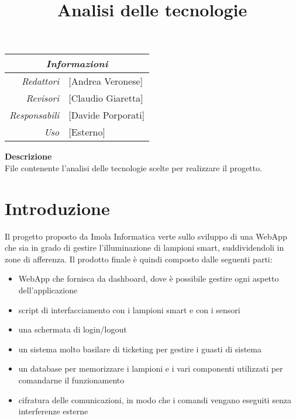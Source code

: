 \documentclass[12pt]{article}
\begin{document}
\graphicspath{ {../templates/img/} }
\setcounter{tocdepth}{4}
\setcounter{secnumdepth}{4}
\title{Analisi delle tecnologie}

\firstPage

\maketitle

\begin{center}
    \begin{tabular}{r | l}
		\multicolumn{2}{c}{\textit{Informazioni}}\\
		\hline
		
			\textit{Redattori} &
			[Andrea Veronese]\makecell{}\\

			\textit{Revisori} &
			[Claudio Giaretta]\makecell{}\\
			\textit{Responsabili} &
			[Davide Porporati]\makecell{}\\
		      \textit{Uso} & 
                [Esterno]\makecell{}\\
    \end{tabular}
\end{center}

\begin{center}
    \textbf{Descrizione}\\
	File contenente l'analisi delle tecnologie scelte per realizzare il progetto. 
\end{center}

\pagebreak

\tableofcontents
\pagebreak

\printindex 


\makeversioni

\section{Introduzione}
Il progetto proposto da Imola Informatica verte sullo sviluppo di una WebApp che sia in grado di gestire l'illuminazione di lampioni smart, suddividendoli in zone di afferenza.
Il prodotto finale è quindi composto dalle seguenti parti:
\begin{itemize}
	\item WebApp che fornisca da dashboard, dove è possibile gestire ogni aspetto dell'applicazione
	\item script di interfacciamento con i lampioni smart e con i sensori
	\item una schermata di login/logout
	\item un sistema molto basilare di ticketing per gestire i guasti di sistema
	\item un database per memorizzare i lampioni e i vari componenti utilizzati per comandarne il funzionamento
	\item cifratura delle comunicazioni, in modo che i comandi vengano eseguiti senza interferenze esterne
\end{itemize}
\end{document}
